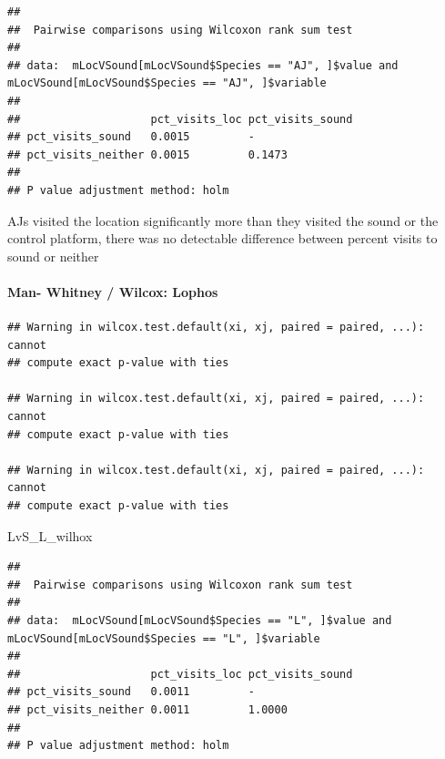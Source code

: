 \documentclass[]{article}
\newenvironment{Shaded}{\begin{snugshade}}{\end{snugshade}}
\newcommand{\KeywordTok}[1]{\textcolor[rgb]{0.13,0.29,0.53}{\textbf{{#1}}}}
\newcommand{\DataTypeTok}[1]{\textcolor[rgb]{0.13,0.29,0.53}{{#1}}}
\newcommand{\StringTok}[1]{\textcolor[rgb]{0.31,0.60,0.02}{{#1}}}
\newcommand{\NormalTok}[1]{{#1}}
\let\oldparagraph\paragraph
\renewcommand{\paragraph}[1]{\oldparagraph{#1}\mbox{}}
\begin{document}
\begin{verbatim}
## 
##  Pairwise comparisons using Wilcoxon rank sum test 
## 
## data:  mLocVSound[mLocVSound$Species == "AJ", ]$value and mLocVSound[mLocVSound$Species == "AJ", ]$variable 
## 
##                    pct_visits_loc pct_visits_sound
## pct_visits_sound   0.0015         -               
## pct_visits_neither 0.0015         0.1473          
## 
## P value adjustment method: holm
\end{verbatim}

AJs visited the location significantly more than they visited the sound
or the control platform, there was no detectable difference between
percent visits to sound or neither

\paragraph{Man- Whitney / Wilcox:
Lophos}\label{man--whitney-wilcox-lophos}

\begin{Shaded}
\end{Shaded}

\begin{verbatim}
## Warning in wilcox.test.default(xi, xj, paired = paired, ...): cannot
## compute exact p-value with ties

## Warning in wilcox.test.default(xi, xj, paired = paired, ...): cannot
## compute exact p-value with ties

## Warning in wilcox.test.default(xi, xj, paired = paired, ...): cannot
## compute exact p-value with ties
\end{verbatim}

\begin{Shaded}
\begin{Highlighting}[]
\NormalTok{LvS_L_wilhox}
\end{Highlighting}
\end{Shaded}

\begin{verbatim}
## 
##  Pairwise comparisons using Wilcoxon rank sum test 
## 
## data:  mLocVSound[mLocVSound$Species == "L", ]$value and mLocVSound[mLocVSound$Species == "L", ]$variable 
## 
##                    pct_visits_loc pct_visits_sound
## pct_visits_sound   0.0011         -               
## pct_visits_neither 0.0011         1.0000          
## 
## P value adjustment method: holm
\end{verbatim}
\end{document}
